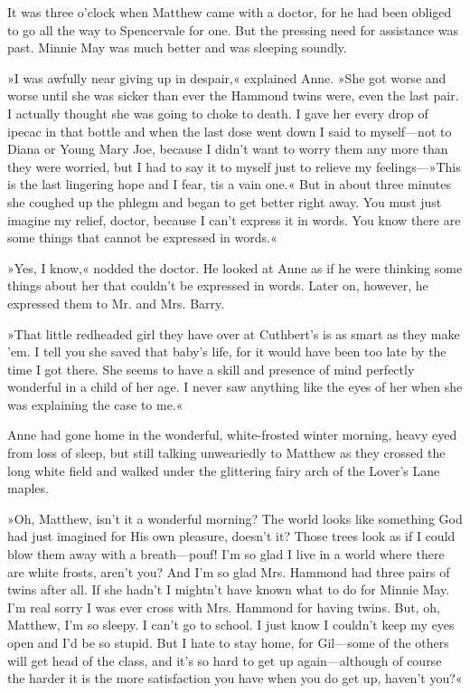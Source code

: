 It was three o’clock when Matthew came with a doctor, for he had been obliged to go all the way to Spencervale for one. But the pressing need for assistance was past. Minnie May was much better and was sleeping soundly.

»I was awfully near giving up in despair,« explained Anne. »She got worse and worse until she was sicker than ever the Hammond twins were, even the last pair. I actually thought she was going to choke to death. I gave her every drop of ipecac in that bottle and when the last dose went down I said to myself—not to Diana or Young Mary Joe, because I didn’t want to worry them any more than they were worried, but I had to say it to myself just to relieve my feelings—»This is the last lingering hope and I fear, tis a vain one.« But in about three minutes she coughed up the phlegm and began to get better right away. You must just imagine my relief, doctor, because I can’t express it in words. You know there are some things that cannot be expressed in words.«

»Yes, I know,« nodded the doctor. He looked at Anne as if he were thinking some things about her that couldn’t be expressed in words. Later on, however, he expressed them to Mr. and Mrs. Barry.

»That little redheaded girl they have over at Cuthbert’s is as smart as they make 'em. I tell you she saved that baby's life, for it would have been too late by the time I got there. She seems to have a skill and presence of mind perfectly wonderful in a child of her age. I never saw anything like the eyes of her when she was explaining the case to me.«

Anne had gone home in the wonderful, white-frosted winter morning, heavy eyed from loss of sleep, but still talking unweariedly to Matthew as they crossed the long white field and walked under the glittering fairy arch of the Lover’s Lane maples.

»Oh, Matthew, isn’t it a wonderful morning? The world looks like something God had just imagined for His own pleasure, doesn’t it? Those trees look as if I could blow them away with a breath—pouf! I’m so glad I live in a world where there are white frosts, aren’t you? And I’m so glad Mrs. Hammond had three pairs of twins after all. If she hadn’t I mightn’t have known what to do for Minnie May. I’m real sorry I was ever cross with Mrs. Hammond for having twins. But, oh, Matthew, I’m so sleepy. I can’t go to school. I just know I couldn’t keep my eyes open and I’d be so stupid. But I hate to stay home, for Gil—some of the others will get head of the class, and it’s so hard to get up again—although of course the harder it is the more satisfaction you have when you do get up, haven’t you?«

